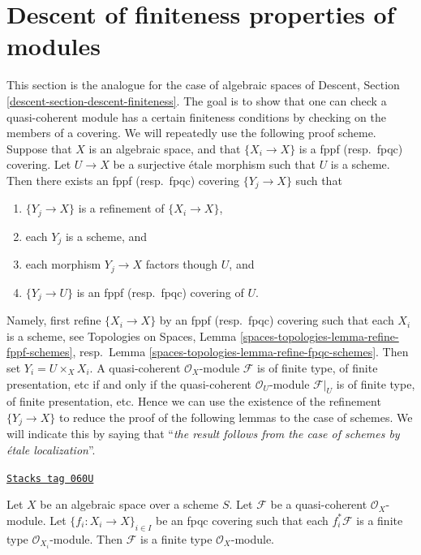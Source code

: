 \section{Descent of finiteness properties of modules}
\label{spaces-descent-section-descent-finiteness}
This section is the analogue for the case of algebraic spaces of
Descent, Section \ref{descent-section-descent-finiteness}.
The goal is to show that one can check a quasi-coherent module
has a certain finiteness conditions by checking on the members of
a covering. We will repeatedly use the following proof scheme.
Suppose that $X$ is an algebraic space, and that $\{X_i \to X\}$
is a fppf (resp.\ fpqc) covering. Let $U \to X$ be a surjective
\'etale morphism such that $U$ is a scheme. Then there exists an
fppf (resp.\ fpqc) covering $\{Y_j \to X\}$ such that
\begin{enumerate}
\item $\{Y_j \to X\}$ is a refinement of $\{X_i \to X\}$,
\item each $Y_j$ is a scheme, and
\item each morphism $Y_j \to X$ factors though $U$, and
\item $\{Y_j \to U\}$ is an fppf (resp.\ fpqc) covering of $U$.
\end{enumerate}
Namely, first refine $\{X_i \to X\}$ by an fppf (resp.\ fpqc)
covering such that each $X_i$ is a scheme, see
Topologies on Spaces, Lemma \ref{spaces-topologies-lemma-refine-fppf-schemes},
resp.\ Lemma \ref{spaces-topologies-lemma-refine-fpqc-schemes}.
Then set $Y_i = U \times_X X_i$. A quasi-coherent
$\mathcal{O}_X$-module $\mathcal{F}$ is of finite type, of
finite presentation, etc if and only if the quasi-coherent
$\mathcal{O}_U$-module $\mathcal{F}|_U$ is of finite type, of
finite presentation, etc. Hence we can use the existence of the
refinement $\{Y_j \to X\}$ to reduce the proof of the following
lemmas to the case of schemes. We will indicate this by saying
that ``{\it the result follows from the case of schemes by
\'etale localization}''.

\begin{lemma}
\label{spaces-descent-lemma-finite-type-descends}
\href{https://stacks.math.columbia.edu/tag/060U}{\texttt{Stacks tag 060U}}

Let $X$ be an algebraic space over a scheme $S$.
Let $\mathcal{F}$ be a quasi-coherent $\mathcal{O}_X$-module.
Let $\{f_i : X_i \to X\}_{i \in I}$ be an fpqc covering such that
each $f_i^*\mathcal{F}$ is a finite type $\mathcal{O}_{X_i}$-module.
Then $\mathcal{F}$ is a finite type $\mathcal{O}_X$-module.
\end{lemma}

